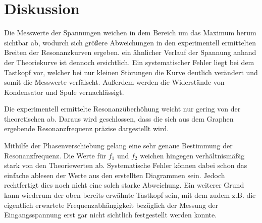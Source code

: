\section{Diskussion}
\label{sec:Diskussion}

Die Messwerte der Spannungen weichen in dem Bereich um das Maximum herum sichtbar ab, wodurch sich größere Abweichungen
in den experimentell ermittelten Breiten der Resonanzkurven ergeben. ein ähnlicher Verlauf der Spannung anhand
der Theoriekurve ist dennoch ersichtlich.
Ein systematischer Fehler liegt bei dem Tastkopf vor,
welcher bei nur kleinen Störungen die Kurve deutlich verändert und somit die Messwerte verfälscht. Außerdem
werden die Widerstände von Kondensator und Spule vernachlässigt.


Die experimentell ermittelte Resonanzüberhöhung weicht nur gering von der theoretischen ab. Daraus wird
geschlossen, dass die sich aus dem Graphen ergebende Resonanzfrequenz präzise dargestellt wird.

Mithilfe der Phasenverschiebung gelang eine sehr genaue Bestimmung der Resonanzfrequenz. Die Werte
für $f_1$ und $f_2$ weichen hingegen verhältnismäßig stark von den Theoriewerten ab. Systematische
Fehler können dabei schon das einfache ablesen der Werte aus den erstellten Diagrammen sein.
Jedoch rechtfertigt dies noch nicht eine solch starke Abweichung. Ein weiterer Grund
kann wiederum der oben bereits erwähnte Tastkopf sein, mit dem zudem z.B. die eigentlich
erwartete Frequenzabhängigkeit bezüglich der Messung der Eingangsspannung erst gar nicht
sichtlich festgestellt werden konnte.
